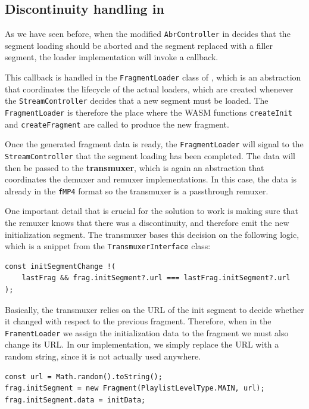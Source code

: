 \subsection{Discontinuity handling in \hlsjs{}}
\label{sec:improvements/impl/discontinuities}

As we have seen before, when the modified \texttt{AbrController} in \hlsjs{} decides that the segment loading should be aborted and the segment replaced with a filler segment, the loader implementation will invoke a callback.

This callback is handled in the \texttt{FragmentLoader} class of \hlsjs{}, which is an abstraction that coordinates the lifecycle of the actual loaders, which are created whenever the \texttt{StreamController} decides that a new segment must be loaded. The \texttt{FragmentLoader} is therefore the place where the WASM functions \texttt{createInit} and \texttt{createFragment} are called to produce the new fragment.

Once the generated fragment data is ready, the \texttt{FragmentLoader} will signal to the \texttt{StreamController} that the segment loading has been completed. The data will then be passed to the \textbf{transmuxer}, which is again an abstraction that coordinates the demuxer and remuxer implementations. In this case, the data is already in the \texttt{fMP4} format so the transmuxer is a passthrough remuxer.

One important detail that is crucial for the solution to work is making sure that the remuxer knows that there was a discontinuity, and therefore emit the new initialization segment. The transmuxer bases this decision on the following logic, which is a snippet from the \texttt{TransmuxerInterface} class:

\begin{verbatim}
const initSegmentChange !(
    lastFrag && frag.initSegment?.url === lastFrag.initSegment?.url
);
\end{verbatim}

Basically, the transmuxer relies on the URL of the init segment to decide whether it changed with respect to the previous fragment. Therefore, when in the \texttt{FramentLoader} we assign the initialization data to the fragment we must also change its URL. In our implementation, we simply replace the URL with a random string, since it is not actually used anywhere.

\begin{verbatim}
const url = Math.random().toString();
frag.initSegment = new Fragment(PlaylistLevelType.MAIN, url);
frag.initSegment.data = initData;
\end{verbatim}

